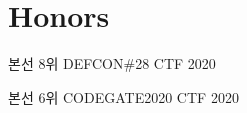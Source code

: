 \section{Honors}
\begin{cvhonors}

\cvhonor
{본선 8위} %
{DEFCON\#28 CTF} %
{} %
{2020} %

\cvhonor
{본선 6위} %
{CODEGATE2020 CTF} %
{} %
{2020} %

\end{cvhonors}
